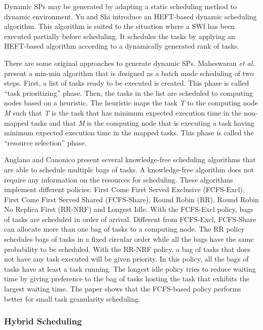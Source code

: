 Dynamic SPs may be generated by adapting a static scheduling method to dynamic environment. 
Yu and Shi \cite{Yu2007} introduce an HEFT-based dynamic
scheduling algorithm. This algorithm is suited to the situation where
a SWf has been executed partially before scheduling.
It schedules the tasks by applying an HEFT-based algorithm according
to a dynamically generated rank of tasks.

There are some original approaches to generate dynamic SPs. 
Maheswaran \textit{et al.} \cite{Maheswaran1999} present a min-min algorithm that
is designed as a batch mode scheduling of two steps. First, a list
of tasks ready to be executed is created. This phase is called \textquotedblleft{}task
prioritizing\textquotedblright{} phase. Then, the tasks in the list
are scheduled to computing nodes based on a heuristic. The heuristic maps
the task \textit{T} to the computing node \textit{M} such that \textit{T}
is the task that has minimum expected execution time in the non-mapped
tasks and that \textit{M} is the computing node that is executing a task
having minimum expected execution time in the mapped tasks. This phase
is called the \textquotedblleft{}resource selection\textquotedblright{}
phase.

Anglano and Canonico \cite{Anglano2008} present several knowledge-free scheduling
algorithms that are able to schedule multiple bags of tasks.
A knowledge-free algorithm does not require any
information on the resources for scheduling. These algorithms
implement different policies: First Come First Served \textendash{} Exclusive
(FCFS-Excl), First Come First Served \textendash{} Shared (FCFS-Share),
Round Robin (RR), Round Robin \textendash{}No Replica First (RR-NRF)
and Longest Idle. With the FCFS-Excl policy, bags of tasks are scheduled
in order of arrival. Different from FCFS-Excl, FCFS-Share can allocate
more than one bag of tasks to a computing node. The RR policy schedules
bags of tasks in a fixed circular order while all the bags have the
same probability to be scheduled. With the RR-NRF policy, a bag of tasks
that does not have any task executed will be given priority. In this
policy, all the bags of tasks have at least a task running. The longest
idle policy tries to reduce waiting time by giving preference to the
bag of tasks hosting the task that exhibits the largest waiting time.
The paper shows that the FCFS-based policy performs better for small task
granularity scheduling. 


\subsubsection{Hybrid Scheduling}

